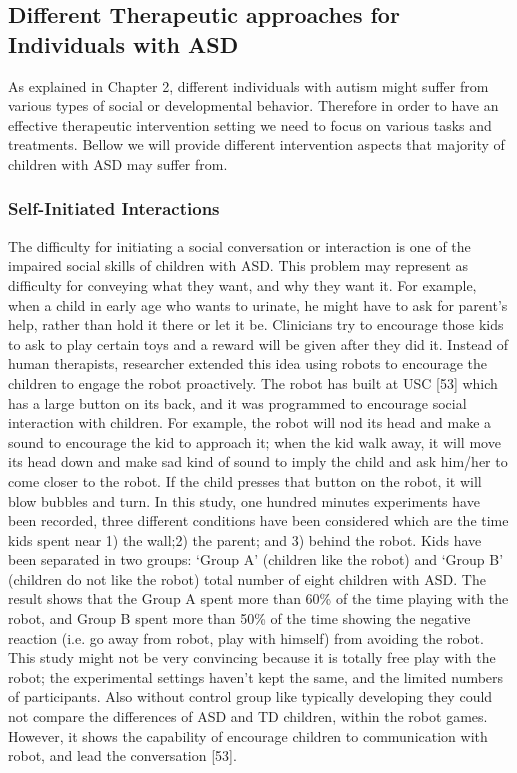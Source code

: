 \subsection{Different Therapeutic approaches for Individuals with ASD}
As explained in Chapter 2, different individuals with autism might suffer from various types of social or developmental behavior. Therefore in order to have an effective therapeutic intervention setting we need to focus on various tasks and treatments. Bellow we will provide different intervention aspects that majority of children with ASD may suffer from.
\subsubsection{Self-Initiated Interactions}
The difficulty for initiating a social conversation or interaction is one of the impaired social skills of children with ASD. This problem may represent as difficulty for conveying what they want, and why they want it. For example, when a child in early age who wants to urinate, he might have to ask for parent’s help, rather than hold it there or let it be. Clinicians try to encourage those kids to ask to play certain toys and a reward will be given after they did it. Instead of human therapists, researcher extended this idea using robots to encourage the children to engage the robot proactively. The robot has built at USC [53] which has a large button on its back, and it was programmed to encourage social interaction with children. For example, the robot will nod its head and make a sound to encourage the kid to approach it; when the kid walk away, it will move its head down and make sad kind of sound to imply the child and ask him/her to come closer to the robot. If the child presses that button on the robot, it will blow bubbles and turn. In this study, one hundred minutes experiments have been recorded, three different conditions have been considered which are the time kids spent near 1) the wall;2) the parent; and 3) behind the robot. Kids have been separated in two groups: ‘Group A’ (children like the robot) and ‘Group B’ (children do not like the robot) total number of eight children with ASD. The result shows that the Group A spent more than 60\% of the time playing with the robot, and Group B spent more than 50\% of the time showing the negative reaction (i.e. go away from robot, play with himself) from avoiding the robot. This study might not be very convincing because it is totally free play with the robot; the experimental settings haven’t kept the same, and the limited numbers of participants. Also without control group like typically developing they could not compare the differences of ASD and TD children, within the robot games. However, it shows the capability of encourage children to communication with robot, and lead the conversation [53].
